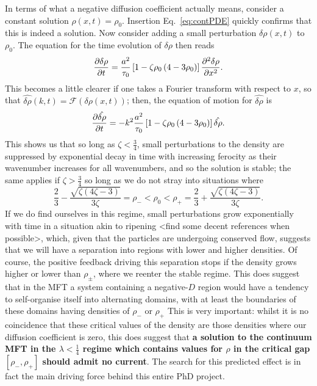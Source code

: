 In terms of what a negative diffusion coefficient actually means, consider a constant solution $\rho(x, t) = \rho_0$. Insertion Eq.~\ref{eq:contPDE} quickly confirms that this is indeed a solution. Now consider adding a small
perturbation $\delta\rho (x, t)$ to $\rho_0$. The equation for the time evolution of $\delta \rho$ then reads
\begin{equation}
 \frac{\partial \delta\rho}{\partial t} = \frac{a^2}{\tau_0} \left[1 - \zeta \rho_0\left(4-3\rho_0\right) \right] \frac{\partial ^2 \delta \rho}{\partial x^2}.
\end{equation}
This becomes a little clearer if one takes a Fourier transform with respect to $x$, so that $\hat{\delta \rho} (k, t) = \mathcal{F}(\delta \rho(x, t))$; then, the equation of motion for $\hat{\delta \rho}$ is
\begin{equation}
 \frac{\partial \hat{\delta \rho}}{\partial t} = - k^2 \frac{a^2}{\tau_0} \left[1 - \zeta \rho_0\left(4-3\rho_0\right) \right] \hat{\delta \rho}.
\end{equation}
This shows us that so long as $\zeta<\frac{3}{4}$, small perturbations to the density are suppressed by exponential decay in time with increasing ferocity as their wavenumber increases for all wavenumbers,
and so the solution is stable; the same applies if $\zeta>\frac{3}{4}$ so long as we do not stray into situations where
\begin{equation}
\label{eq:rhoPmDefn}
\frac{2}{3} - \frac{\sqrt{\zeta(4\zeta-3)}}{3\zeta} = \rho_- < \rho_0 < \rho_+ = \frac{2}{3} + \frac{\sqrt{\zeta(4\zeta-3)}}{3\zeta}.
\end{equation}
If we do find ourselves in this regime, small perturbations grow exponentially with time in a situation akin to ripening <find some decent references when possible>,
which, given that the particles are undergoing conserved flow, suggests that we will have a separation into regions with lower and higher
densities. Of course, the positive feedback driving this separation stops if the density grows higher or lower than $\rho_\pm$, where we reenter the stable regime. This does suggest that in the MFT a system containing a negative-$D$
region would have a tendency to self-organise itself into alternating domains, with at least the boundaries of these domains having densities of $\rho_-$ or $\rho_+$ This is very important: whilst it is no coincidence that these
critical values of the density are those densities where our diffusion coefficient is zero, this does suggest that \textbf{a solution to the continuum MFT in the $\lambda<\frac{1}{4}$ regime  which contains values for $\rho$
in the critical gap $[\rho_-, \rho_+]$ should admit no current}. The search for this predicted effect is in fact the main driving force behind this entire PhD project.


